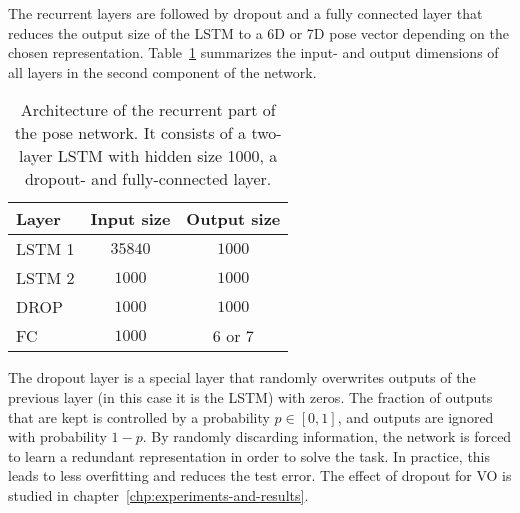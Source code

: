 			The recurrent layers are followed by dropout and a fully connected layer that reduces the output size of the LSTM to a 6D or 7D pose vector depending on the chosen representation.
			Table~\ref{tbl:lstm_and_fc_after_flownet} summarizes the input- and output dimensions of all layers in the second component of the network.
			\begin{table}[tb]
				\small
				\begin{center}
					\begin{tabular}{lcc}
						\toprule
						Layer 		& Input size 					& Output size			\\
						\midrule
						LSTM 1 		& $35840$						& $1000$  				\\
						LSTM 2 		& $1000$						& $1000$ 				\\
						DROP		& $1000$						& $1000$				\\
						FC 			& $1000$						& $6$ or $7$			\\
						\bottomrule
					\end{tabular}
				\end{center}
				\caption[Architecture of the recurrent part of the pose network]
						{Architecture of the recurrent part of the pose network.
						 It consists of a two-layer LSTM with hidden size 1000, a dropout- and fully-connected layer.}
				\label{tbl:lstm_and_fc_after_flownet}
			\end{table}
			The dropout layer is a special layer that randomly overwrites outputs of the previous layer (in this case it is the LSTM) with zeros.
			The fraction of outputs that are kept is controlled by a probability $p \in [0, 1]$, and outputs are ignored with probability $1 - p$.
			By randomly discarding information, the network is forced to learn a redundant representation in order to solve the task.
			In practice, this leads to less overfitting and reduces the test error.
			The effect of dropout for VO is studied in chapter~\ref{chp:experiments-and-results}.
						
